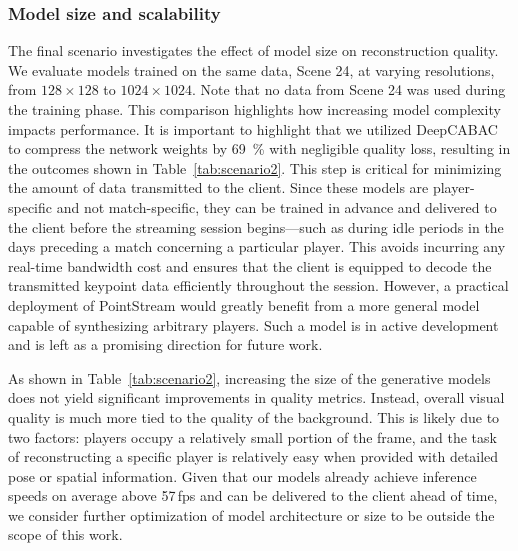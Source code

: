 \documentclass[manuscript, screen]{acmart}
\newcommand{\ie}{\emph{i.e.}, }
\newcommand{\vxv}[2]{$#1\!\times\!#2$}
\begin{document}
\subsubsection*{Model size and scalability}
The final scenario investigates the effect of model size on reconstruction quality. We evaluate models trained on the same data, Scene 24, at varying resolutions, from \vxv{128}{128} to \vxv{1024}{1024}. Note that no data from Scene 24 was used during the training phase. This comparison highlights how increasing model complexity impacts performance. It is important to highlight that we utilized DeepCABAC~\cite{wiedemann2019deepcabac} to compress the network weights by \qty{69}{\percent} with negligible quality loss, resulting in the outcomes shown in Table~\ref{tab:scenario2}. This step is critical for minimizing the amount of data transmitted to the client. Since these models are player-specific and not match-specific, they can be trained in advance and delivered to the client before the streaming session begins—such as during idle periods in the days preceding a match concerning a particular player. This avoids incurring any real-time bandwidth cost and ensures that the client is equipped to decode the transmitted keypoint data efficiently throughout the session.
However, a practical deployment of PointStream would greatly benefit from a more general model capable of synthesizing arbitrary players. Such a model is in active development and is left as a promising direction for future work.

As shown in Table~\ref{tab:scenario2}, increasing the size of the generative models does not yield significant improvements in quality metrics. Instead, overall visual quality is much more tied to the quality of the background. This is likely due to two factors: players occupy a relatively small portion of the frame, and the task of reconstructing a specific player is relatively easy when provided with detailed pose or spatial information.
Given that our models already achieve inference speeds on average above \num{57}\,fps and can be delivered to the client ahead of time, we consider further optimization of model architecture or size to be outside the scope of this work.


\end{document}

